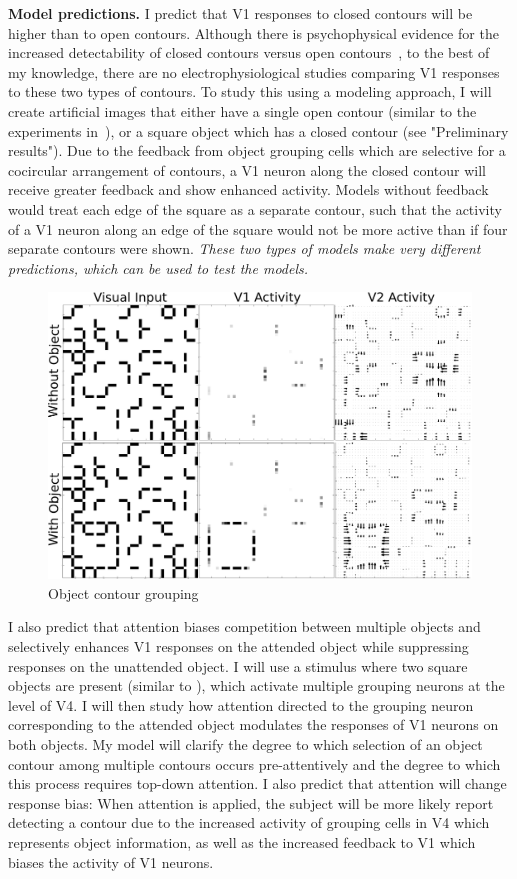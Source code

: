 \documentclass[11pt,notitlepage]{article}
\begin{document}
\textbf{Model predictions.}
I predict that V1 responses to closed contours will be higher than to
open contours. Although there is psychophysical evidence for the
increased detectability of closed contours versus open
contours~\citep{Kovacs_Julesz93}, to the best of my knowledge, there
are no electrophysiological studies comparing V1 responses to these
two types of contours. To study this
%
using a modeling approach, 
I will create artificial images that either have a single open contour (similar to the experiments in~\citet{Chen_etal14}), or a square object which has a closed contour
(see "Preliminary results"). Due to the feedback from object grouping
cells which are selective for a cocircular arrangement of contours, a
V1 neuron along the closed contour will receive greater feedback and
show enhanced activity. Models without feedback would treat each edge
of the square as a separate contour, such that the activity of a V1
neuron along an edge of the square would not be more active than if
four separate contours were shown. {\em These two types of models make very different predictions, which can be used to test the models.}

\begin{figure}
  \vspace{-10pt}
  \centering 
  \includegraphics[width=.45\textwidth]{figs/contour_revised}
  \caption{Object contour grouping} 
  \vspace{-5pt}
  \label{fig:ContourGrouping}
\end{figure}

I also predict that attention biases competition between
multiple objects and selectively enhances V1 responses on the attended
object while suppressing responses on the unattended object. I will use a stimulus where two square objects are present
(similar to \citep{Qiu_etal07}), which activate multiple grouping
neurons at the level of V4. I will then study how attention directed
to the grouping neuron corresponding to the attended object modulates
the responses of V1 neurons on both objects. 
My model will clarify the degree to which selection of an object contour among multiple contours
occurs pre-attentively and the degree to which this process
requires top-down attention. I also predict that attention will change
response bias: When attention is applied, the subject will
be more likely report detecting a contour due to the increased
activity of grouping cells in V4 which represents object information,
as well as the increased feedback to V1 which biases the activity of
V1 neurons.
\end{document}
